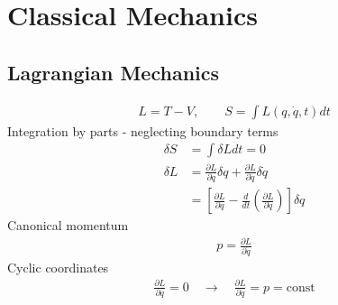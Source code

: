\documentclass[10pt,a4paper]{book}
\theoremstyle{definition}
\begin{document}
\section{Classical Mechanics}

\subsection{Lagrangian Mechanics}
\begin{align}
L=T-V,\qquad S=\int L(q,\dot{q},t) dt
\end{align}
Integration by parts - neglecting boundary terms
\begin{align}
\delta S&=\int \delta L dt=0\\
\delta L&=\frac{\partial L}{\partial q}\delta q+\frac{\partial L}{\partial \dot{q}}\delta \dot{q}\\
&=\left[\frac{\partial L}{\partial q}-\frac{d}{dt}\left(\frac{\partial L}{\partial \dot{q}}\right)\right]\delta q
\end{align}
Canonical momentum
\begin{align}
p=\frac{\partial L}{\partial \dot{q}}
\end{align}
Cyclic coordinates
\begin{align}
\frac{\partial L}{\partial q}=0\quad\rightarrow\quad\frac{\partial L}{\partial \dot{q}}=p=\text{const}
\end{align}
\end{document}
